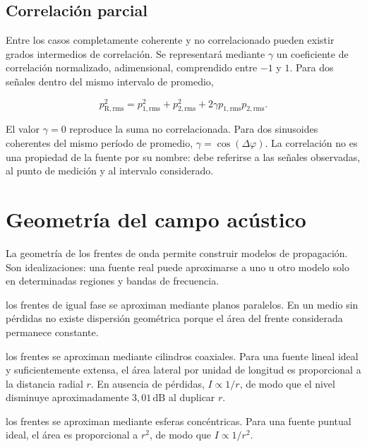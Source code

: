 \subsection{Correlación parcial}
\label{sec:u4-correlacion-parcial}

Entre los casos completamente coherente y no correlacionado pueden existir
grados intermedios de correlación. Se representará mediante \(\gamma\) un
coeficiente de correlación normalizado, adimensional, comprendido entre
\(-1\) y \(1\). Para dos señales dentro del mismo intervalo de promedio,

\begin{equation}
    p_{\mathrm{R,rms}}^2
      =p_{1,\mathrm{rms}}^2+p_{2,\mathrm{rms}}^2
       +2\gamma p_{1,\mathrm{rms}}p_{2,\mathrm{rms}}.
    \label{eq:u4-suma-correlacion-parcial}
\end{equation}

El valor \(\gamma=0\) reproduce la suma no correlacionada. Para dos sinusoides
coherentes del mismo período de promedio,
\(\gamma=\cos(\Delta\varphi)\). La correlación no es una propiedad de la
fuente por su nombre: debe referirse a las señales observadas, al punto de
medición y al intervalo considerado.

\section{Geometría del campo acústico}
\label{sec:u4-geometria-campo}

La geometría de los frentes de onda permite construir modelos de propagación.
Son idealizaciones: una fuente real puede aproximarse a uno u otro modelo solo
en determinadas regiones y bandas de frecuencia.

\begin{description}[style=nextline]
    \item[\textbf{Onda plana:}]
    los frentes de igual fase se aproximan mediante planos paralelos. En un
    medio sin pérdidas no existe dispersión geométrica porque el área del
    frente considerada permanece constante.

    \item[\textbf{Onda cilíndrica:}]
    los frentes se aproximan mediante cilindros coaxiales. Para una fuente
    lineal ideal y suficientemente extensa, el área lateral por unidad de
    longitud es proporcional a la distancia radial \(r\). En ausencia de
    pérdidas, \(I\propto1/r\), de modo que el nivel disminuye aproximadamente
    \(3{,}01\,\text{dB}\) al duplicar \(r\).

    \item[\textbf{Onda esférica:}]
    los frentes se aproximan mediante esferas concéntricas. Para una fuente
    puntual ideal, el área es proporcional a \(r^2\), de modo que
    \(I\propto1/r^2\).
\end{description}

